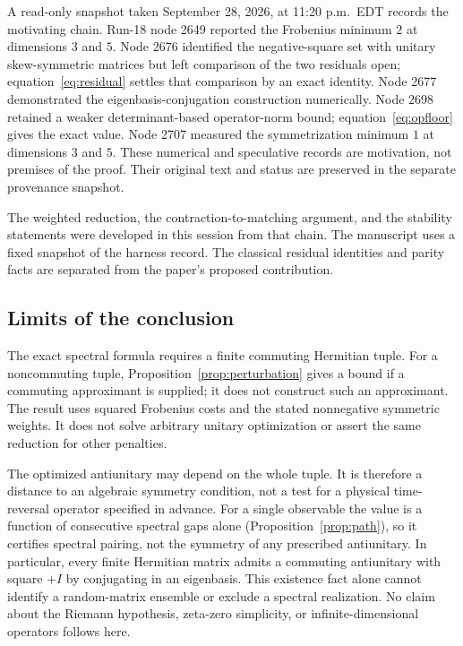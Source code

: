 \documentclass[11pt]{article}
\begin{document}
A read-only snapshot taken September 28, 2026, at 11:20 p.m.\ EDT
records the motivating chain. Run-18 node 2649 reported the Frobenius
minimum $2$ at dimensions $3$ and $5$. Node 2676 identified the
negative-square set with unitary skew-symmetric matrices but left
comparison of the two residuals open; equation~\eqref{eq:residual}
settles that comparison by an exact identity. Node 2677 demonstrated
the eigenbasis-conjugation construction numerically. Node 2698 retained
a weaker determinant-based operator-norm bound; equation~\eqref{eq:opfloor}
gives the exact value. Node 2707 measured the symmetrization minimum $1$
at dimensions $3$ and $5$. These numerical and speculative records are
motivation, not premises of the proof. Their original text and status
are preserved in the separate provenance snapshot.

The weighted reduction, the contraction-to-matching argument, and the
stability statements were developed in this session from that chain. The
manuscript uses a fixed snapshot of the harness record. The classical residual identities and parity
facts are separated from the paper's proposed contribution.

\subsection{Limits of the conclusion}

The exact spectral formula requires a finite commuting Hermitian tuple.
For a noncommuting tuple, Proposition~\ref{prop:perturbation} gives a
bound if a commuting approximant is supplied; it does not construct
such an approximant. The result uses squared Frobenius costs and the
stated nonnegative symmetric weights. It does not solve arbitrary
unitary optimization or assert the same reduction for other penalties.

The optimized antiunitary may depend on the whole tuple. It is therefore
a distance to an algebraic symmetry condition, not a test for a physical
time-reversal operator specified in advance. For a single observable the
value is a function of consecutive spectral gaps alone
(Proposition~\ref{prop:path}), so it certifies spectral pairing, not the
symmetry of any prescribed antiunitary. In particular, every finite
Hermitian matrix admits a commuting antiunitary with square $+I$ by
conjugating in an eigenbasis. This existence fact alone cannot identify
a random-matrix ensemble or exclude a spectral realization. No claim
about the Riemann hypothesis, zeta-zero simplicity, or infinite-dimensional
operators follows here.
\end{document}
